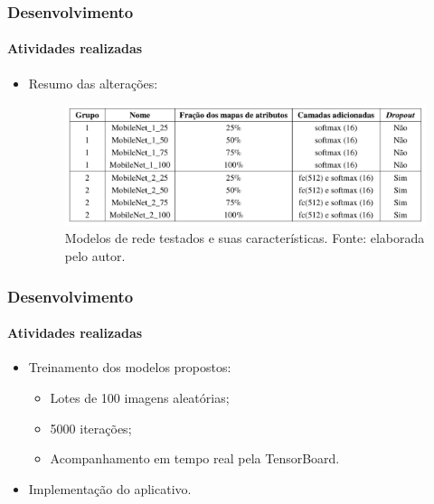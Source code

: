 \documentclass{beamer}
\begin{document}
    \begin{frame}[t]
      \frametitle{Desenvolvimento}
      \framesubtitle{Atividades realizadas}      
      \begin{itemize}
        \item<1-> Resumo das alterações: \medskip
        \begin{figure}[hbt]
      		 	\begin{center}
      				\includegraphics[height=.3 \textwidth]{img/models_table.png}
      			\end{center}
      			\caption{Modelos de rede testados e suas características. Fonte: elaborada pelo autor.}
      		\end{figure}
      \end{itemize}
    \end{frame}
    
    \begin{frame}[t]
      \frametitle{Desenvolvimento}
      \framesubtitle{Atividades realizadas}      
      \begin{itemize}
        \item<1-> Treinamento dos modelos propostos: \medskip
		 \begin{itemize}
        		\item<1-> Lotes de 100 imagens aleatórias; \medskip
        		\item<1-> 5000 iterações; \medskip
        		\item<1-> Acompanhamento em tempo real pela TensorBoard. \medskip
		\end{itemize}        
        \item<2-> Implementação do aplicativo.\medskip
      \end{itemize}
    \end{frame}
        
    
\end{document}
